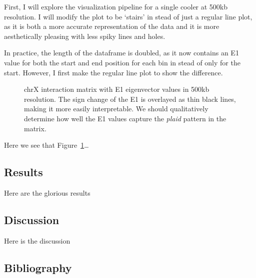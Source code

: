 \documentclass[
  a4paper,
  DIV=11,
  numbers=noendperiod]{scrarticle}
\begin{document}
\label{md-plotting-500kb-single}
First, I will explore the visualization pipeline for a single cooler at
500kb resolution. I will modify the plot to be `stairs' in stead of just
a regular line plot, as it is both a more accurate representation of the
data and it is more aesthetically pleasing with less spiky lines and
holes.

In practice, the length of the dataframe is doubled, as it now contains
an E1 value for both the start and end position for each bin in stead of
only for the start. However, I first make the regular line plot to show
the difference.

\begin{figure}[H]


\caption{\label{fig-matrix_e1_500kb}chrX interaction matrix with E1
eigenvector values in 500kb resolution. The sign change of the E1 is
overlayed as thin black lines, making it more easily interpretable. We
should qualitatively determine how well the E1 values capture the
\emph{plaid} pattern in the matrix.}

\end{figure}%

Here we see that Figure~\ref{fig-matrix_e1_500kb}\ldots{}

\subsection{Results}\label{results}

Here are the glorious results

\subsection{Discussion}\label{discussion}

Here is the discussion

\subsection*{Bibliography}\label{bibliography}
\end{document}
